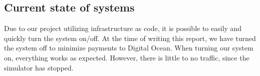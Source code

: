 
\subsection{Current state of systems}

Due to our project utilizing infrastructure as code, it is possible to easily and quickly turn the system on/off. At the time of writing this report, we have turned the system off to minimize payments to Digital Ocean. When turning our system on, everything works as expected. However, there is little to no traffic, since the simulator has stopped. 
